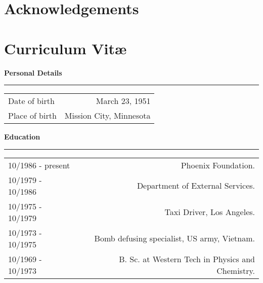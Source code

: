 \label{acknowledgements}
%
%
%
%
%
\section{Acknowledgements}
%
%
\lipsum[1-2]
%
%
%
%
%
%
%
\newpage
\section{Curriculum Vit\ae}
\vspace{1cm}
%
%
{\hspace{.1cm}\textbf{Personal Details}}\vspace{.2cm}
{\color{lightgray}\hrule}
\begin{longtable}{l r}
Date of birth & \begin{minipage}[t]{0.7\textwidth}March 23, 1951 \vspace{.5cm}\end{minipage}\\[-0.3cm]
Place of birth & \begin{minipage}[t]{0.7\textwidth}Mission City, Minnesota \vspace{.5cm}\end{minipage}\\[-0.3cm]
\end{longtable}
%
\vspace{.1cm}
%
{\hspace{-.5cm}\textbf{Education}}\vspace{.2cm}
{\color{lightgray}\hrule}
\begin{longtable}{l r}
10/1986 - present & \begin{minipage}[t]{0.7\textwidth}
                    Phoenix Foundation.\vspace{.5cm}
                 \end{minipage}\\ 
10/1979 - 10/1986 & \begin{minipage}[t]{0.7\textwidth}
               Department of External Services.\vspace{.5cm}
              \end{minipage}\\
10/1975 - 10/1979 & \begin{minipage}[t]{0.7\textwidth}
                Taxi Driver, Los Angeles.\vspace{.5cm}
              \end{minipage}\\
10/1973 - 10/1975 & \begin{minipage}[t]{0.7\textwidth}
                Bomb defusing specialist, US army, Vietnam.\vspace{.5cm}
              \end{minipage}\\
10/1969 - 10/1973 & \begin{minipage}[t]{0.7\textwidth}
           B. Sc. at Western Tech in Physics and Chemistry.
           \end{minipage}\\
\end{longtable}
